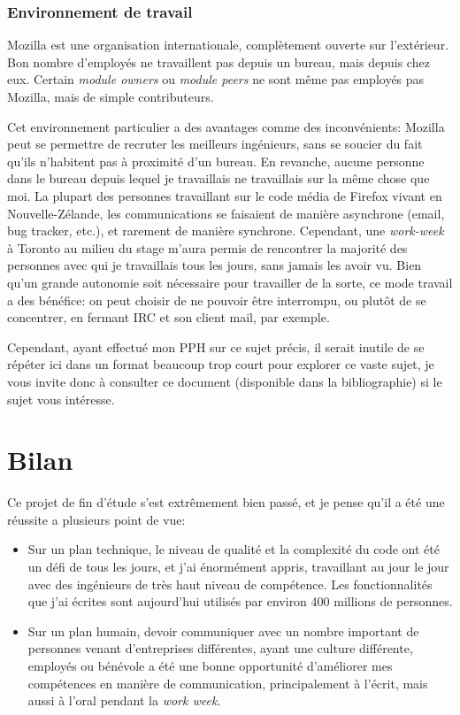 \documentclass[a4paper,10pt]{article}
\begin{document}
\begin{multicols}{2}
  \section{Environnement de travail}
  Mozilla est une organisation internationale, complètement ouverte sur
  l'extérieur. Bon nombre d'employés ne travaillent pas depuis un bureau, mais
  depuis chez eux. Certain \emph{module owners} ou \emph{module peers} ne sont
  même pas employés pas Mozilla, mais de simple contributeurs.

  Cet environnement particulier a des avantages comme des inconvénients: Mozilla
  peut se permettre de recruter les meilleurs ingénieurs, sans se soucier du
  fait qu'ils n'habitent pas à proximité d'un bureau. En revanche, aucune
  personne dans le bureau depuis lequel je travaillais ne travaillais sur la
  même chose que moi. La plupart des personnes travaillant sur le code média de
  Firefox vivant en Nouvelle-Zélande, les communications se faisaient de manière
  asynchrone (email, bug tracker, etc.), et rarement de manière synchrone.
  Cependant, une \emph{work-week} à Toronto au milieu du stage m'aura permis de
  rencontrer la majorité des personnes avec qui je travaillais tous les jours,
  sans jamais les avoir vu. Bien qu'un grande autonomie soit nécessaire pour
  travailler de la sorte, ce mode travail a des bénéfice: on peut choisir de ne
  pouvoir être interrompu, ou plutôt de se concentrer, en fermant IRC et son
  client mail, par exemple.

  Cependant, ayant effectué mon PPH\cite{PPH} sur ce sujet précis, il serait
  inutile de se répéter ici dans un format beaucoup trop court pour explorer ce
  vaste sujet, je vous invite donc à consulter ce document (disponible dans la
  bibliographie) si le sujet vous intéresse.

  \clearpage
  \part{Bilan}

  Ce projet de fin d'étude s'est extrêmement bien passé, et je pense qu'il a été
  une réussite a plusieurs point de vue:

  \begin{itemize}
    \item Sur un plan technique, le niveau de qualité et la complexité du code
      ont été un défi de tous les jours, et j'ai énormément appris, travaillant
      au jour le jour avec des ingénieurs de très haut niveau de compétence. Les
      fonctionnalités que j'ai écrites sont aujourd'hui utilisés par environ 400
      millions de personnes.
    \item Sur un plan humain, devoir communiquer avec un nombre important de
      personnes venant d'entreprises différentes, ayant une culture différente,
      employés ou bénévole a été une bonne opportunité d'améliorer mes
      compétences en manière de communication, principalement à l'écrit, mais
      aussi à l'oral pendant la \emph{work week}.
  \end{itemize}


\end{multicols}
\end{document}
